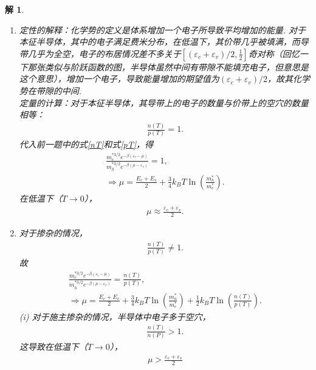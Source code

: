 \documentclass[UTF8,10pt,a4paper]{article}
\theoremstyle{Problem}
\theoremstyle{Solution}
\newtheorem*{sol}{解}
\begin{document}
\begin{sol}
    \begin{enumerate}
        \item[(a)] 定性的解释：化学势的定义是体系增加一个电子所导致平均增加的能量. 对于本征半导体，其中的电子满足费米分布，在低温下，其价带几乎被填满，而导带几乎为全空，电子的布居情况差不多关于$[(\varepsilon_c+\varepsilon_v)/2,\frac{1}{2}]$奇对称（回忆一下那张类似与阶跃函数的图，半导体虽然中间有带隙不能填充电子，但意思是这个意思），增加一个电子，导致能量增加的期望值为$(\varepsilon_c+\varepsilon_v)/2$，故其化学势在带隙的中间.\\
        定量的计算：对于本征半导体，其导带上的电子的数量与价带上的空穴的数量相等：
        \begin{align}
            \frac{n(T)}{p(T)}=1.
        \end{align}
        代入前一题中的式\eqref{nT}和式\eqref{pT}，得
        \begin{gather}
            \frac{m_e^{*3/2}e^{-\beta(\varepsilon_c-\mu)}}{m_h^{*3/2}e^{-\beta(\mu-\varepsilon_v)}}=1,\\
            \Longrightarrow\mu=\frac{E_c+E_v}{2}+\frac{3}{4}k_BT\ln\left(\frac{m_h^*}{m_e^*}\right).
        \end{gather}
        在低温下（$T\rightarrow 0$），
        \begin{align}
            \mu\approx\frac{\varepsilon_c+\varepsilon_v}{2}.
        \end{align}
        \item[(b)] 对于掺杂的情况，
        \begin{align}
            \frac{n(T)}{p(T)}\neq 1.
        \end{align}
        故
        \begin{gather}
            \frac{m_e^{*3/2}e^{-\beta(\varepsilon_c-\mu)}}{m_h^{*3/2}e^{-\beta(\mu-\varepsilon_v)}}=\frac{n(T)}{p(T)},\\
            \Longrightarrow\mu=\frac{E_c+E_v}{2}+\frac{3}{4}k_BT\ln\left(\frac{m_n^*}{m_e^*}\right)+\frac{1}{2}k_BT\ln\left(\frac{n(T)}{p(T)}\right).
        \end{gather}
        (i) 对于施主掺杂的情况，半导体中电子多于空穴，
        \begin{align}
            \frac{n(T)}{n(P)}>1.
        \end{align}
        这导致在低温下（$T\rightarrow 0$），
        \begin{align}
            \mu>\frac{\varepsilon_c+\varepsilon_v}{2}
        \end{align}

\end{enumerate}
\end{sol}
\end{document}
